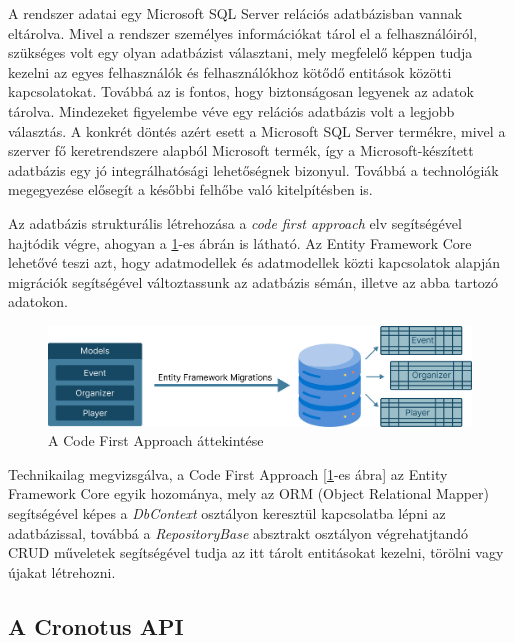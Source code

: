 A rendszer adatai egy Microsoft SQL Server relációs adatbázisban\cite{relationaldatabasedocs} vannak eltárolva. Mivel a rendszer személyes információkat tárol el a felhasználóiról, szükséges volt egy olyan adatbázist választani, mely megfelelő képpen tudja kezelni az egyes felhasználók és felhasználókhoz kötődő entitások közötti kapcsolatokat. Továbbá az is fontos, hogy biztonságosan legyenek az adatok tárolva. Mindezeket  figyelembe véve egy relációs adatbázis volt a legjobb választás. A konkrét döntés azért esett a Microsoft SQL Server termékre, mivel a szerver fő keretrendszere alapból Microsoft termék, így a Microsoft-készített adatbázis egy jó integrálhatósági lehetőségnek bizonyul. Továbbá a technológiák megegyezése elősegít a későbbi felhőbe való kitelpítésben is.

Az adatbázis strukturális létrehozása a \textit{code first approach}\cite{codefirstapproachdocs} elv segítségével hajtódik végre, ahogyan a \ref{fig:code_first_approach}-es ábrán is látható. Az Entity Framework Core lehetővé teszi azt, hogy adatmodellek és adatmodellek közti kapcsolatok alapján migrációk segítségével változtassunk az adatbázis sémán, illetve az abba tartozó adatokon.

\begin{figure}[h]
    \centering
    \includegraphics[width=\textwidth]{./images/code_first_approach.png}
    \caption{A Code First Approach áttekintése}
    \label{fig:code_first_approach}
\end{figure}

Technikailag megvizsgálva, a Code First Approach [\ref{fig:code_first_approach}-es ábra] az Entity Framework Core egyik hozománya, mely az ORM (Object Relational Mapper)\cite{codefirstapproachdocs} segítségével képes a \textit{DbContext} osztályon keresztül kapcsolatba lépni az adatbázissal, továbbá a \textit{RepositoryBase} absztrakt osztályon végrehatjtandó CRUD műveletek\cite{crudoperationdocs} segítségével tudja az itt tárolt entitásokat kezelni, törölni vagy újakat létrehozni.

\subsection{A Cronotus API}

